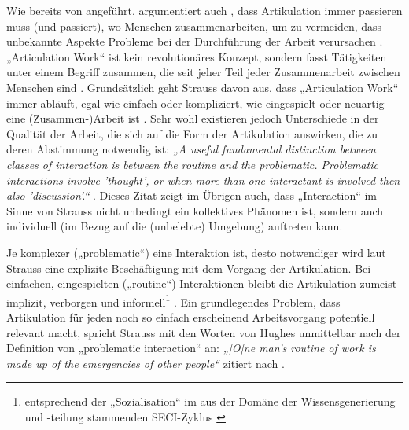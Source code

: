 Wie bereits von \citet{Gerson86} angeführt, argumentiert auch \citeauthor{Strauss88}, dass Artikulation immer passieren muss (und passiert), wo Menschen zusammenarbeiten, um zu vermeiden, dass unbekannte Aspekte Probleme bei der Durchführung der Arbeit verursachen \citep{Strauss88}. „Articulation Work“ ist kein revolutionäres Konzept, sondern fasst Tätigkeiten unter einem Begriff zusammen, die seit jeher Teil jeder Zusammenarbeit zwischen Menschen sind \citep{Strauss88}. Grundsätzlich geht Strauss davon aus, dass „Articulation Work“ immer abläuft, egal wie einfach oder kompliziert, wie eingespielt oder neuartig eine (Zusammen-)Arbeit ist \citep{Strauss88}. Sehr wohl existieren jedoch Unterschiede in der Qualität der Arbeit, die sich auf die Form der Artikulation auswirken, die zu deren Abstimmung notwendig ist: \emph{„A useful fundamental distinction between classes of interaction is between the routine and the problematic. Problematic interactions involve 'thought', or when more than one interactant is involved then also 'discussion'.“} \citep[][S. 43]{Strauss93}. Dieses Zitat zeigt im Übrigen auch, dass „Interaction“ im Sinne von Strauss nicht unbedingt ein kollektives Phänomen ist, sondern auch individuell (im Bezug auf die (unbelebte) Umgebung) auftreten kann.

Je komplexer („problematic“) eine Interaktion ist, desto notwendiger wird laut Strauss eine explizite Beschäftigung mit dem Vorgang der Artikulation. Bei einfachen, eingespielten („routine“) Interaktionen bleibt die Artikulation zumeist implizit, verborgen und informell\footnote{entsprechend der „Sozialisation“ im aus der Domäne der Wissensgenerierung und -teilung stammenden SECI-Zyklus \citep{Nonaka95}} \citep{Hampson05}. Ein grundlegendes Problem, dass Artikulation für jeden noch so einfach erscheinend Arbeitsvorgang potentiell relevant macht, spricht Strauss mit den Worten von Hughes unmittelbar nach der Definition von „problematic interaction“ an: \emph{„[O]ne man's routine of work is made up of the emergencies of other people“} \citep{Hughes71} zitiert nach \citep{Strauss93}.

